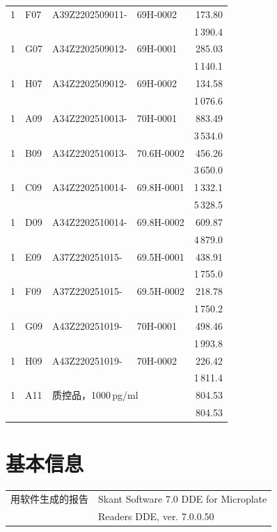 \documentclass[UTF8,10pt,a4paper,fontset=fandol]{ctexart}
\begin{document}
\begin{center}
\begin{tabular}{@{}llllr@{}}
1 & F07 & A39Z2202509011- & 69H-0002 & 173.80 \\
  &     &                  &            & 1\,390.4 \\
1 & G07 & A34Z2202509012- & 69H-0001 & 285.03 \\
  &     &                  &            & 1\,140.1 \\
1 & H07 & A34Z2202509012- & 69H-0002 & 134.58 \\
  &     &                  &            & 1\,076.6 \\
1 & A09 & A34Z2202510013- & 70H-0001 & 883.49 \\
  &     &                  &            & 3\,534.0 \\
1 & B09 & A34Z2202510013- & 70.6H-0002 & 456.26 \\
  &     &                  &              & 3\,650.0 \\
1 & C09 & A34Z2202510014- & 69.8H-0001 & 1\,332.1 \\
  &     &                  &              & 5\,328.5 \\
1 & D09 & A34Z2202510014- & 69.8H-0002 & 609.87 \\
  &     &                  &              & 4\,879.0 \\
1 & E09 & A37Z220251015- & 69.5H-0001 & 438.91 \\
  &     &                  &             & 1\,755.0 \\
1 & F09 & A37Z220251015- & 69.5H-0002 & 218.78 \\
  &     &                  &             & 1\,750.2 \\
1 & G09 & A43Z220251019- & 70H-0001 & 498.46 \\
  &     &                  &            & 1\,993.8 \\
1 & H09 & A43Z220251019- & 70H-0002 & 226.42 \\
  &     &                  &            & 1\,811.4 \\
1 & A11 & \multicolumn{2}{l}{质控品，1000\,pg/ml} & 804.53 \\
  &     &                  &            & 804.53 \\
\end{tabular}
\end{center}

\section*{基本信息}

\begin{tabular}{@{}ll@{}}
用软件生成的报告 & Skant Software 7.0 DDE for Microplate\\
                 & Readers DDE, ver. 7.0.0.50
\end{tabular}
\end{document}

